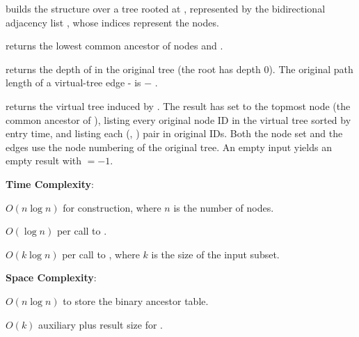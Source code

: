 \begin{compactitem}
  \item {} builds the structure over a tree rooted at , represented by the bidirectional adjacency list , whose indices represent the nodes.
  \item {} returns the lowest common ancestor of nodes  and .
  \item {} returns the depth of  in the original tree (the root has depth $0$). The original path length of a virtual-tree edge - is  $-$ .
  \item {} returns the virtual tree induced by . The result has  set to the topmost node (the common ancestor of ),  listing every original node ID in the virtual tree sorted by entry time, and  listing each (, ) pair in original IDs. Both the node set and the edges use the node numbering of the original tree. An empty input yields an empty result with  $= -1$.
\end{compactitem}

\textbf{Time Complexity}:
\begin{compactitem}
  \item $O(n \log n)$ for construction, where $n$ is the number of nodes.
  \item $O(\log n)$ per call to .
  \item $O(k \log n)$ per call to , where $k$ is the size of the input subset.
\end{compactitem}

\textbf{Space Complexity}:
\begin{compactitem}
  \item $O(n \log n)$ to store the binary ancestor table.
  \item $O(k)$ auxiliary plus result size for .
\end{compactitem}

